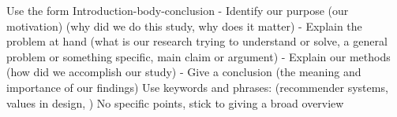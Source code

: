 

Use the form Introduction-body-conclusion
- Identify our purpose (our motivation) (why did we do this study, why does it matter)
- Explain the problem at hand (what is our research trying to understand or solve, a general problem or something specific, main claim or argument)
- Explain our methods (how did we accomplish our study)
- Give a conclusion (the meaning and importance of our findings)
Use keywords and phrases: (recommender systems, values in design, )
No specific points, stick to giving a broad overview

